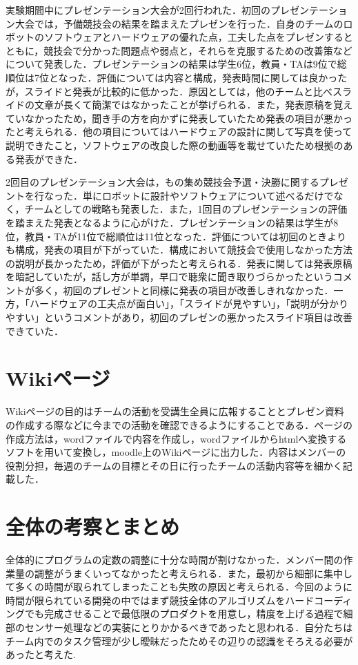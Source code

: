 \begin{multicols*}{2}
実験期間中にプレゼンテーション大会が2回行われた．初回のプレゼンテーション大会では，予備競技会の結果を踏まえたプレゼンを行った．自身のチームのロボットのソフトウェアとハードウェアの優れた点，工夫した点をプレゼンするとともに，競技会で分かった問題点や弱点と，それらを克服するための改善策などについて発表した．プレゼンテーションの結果は学生6位，教員・TAは9位で総順位は7位となった．評価については内容と構成，発表時間に関しては良かったが，スライドと発表が比較的に低かった．原因としては，他のチームと比べスライドの文章が長くて簡潔ではなかったことが挙げられる．また，発表原稿を覚えていなかったため，聞き手の方を向かずに発表していたため発表の項目が悪かったと考えられる．他の項目についてはハードウェアの設計に関して写真を使って説明できたこと，ソフトウェアの改良した際の動画等を載せていたため根拠のある発表ができた．

2回目のプレゼンテーション大会は，もの集め競技会予選・決勝に関するプレゼントを行なった．単にロボットに設計やソフトウェアについて述べるだけでなく，チームとしての戦略も発表した．また，1回目のプレゼンテーションの評価を踏まえた発表となるように心がけた．プレゼンテーションの結果は学生が8位，教員・TAが11位で総順位は11位となった．評価については初回のときよりも構成，発表の項目が下がっていた．構成において競技会で使用しなかった方法の説明が長かったため，評価が下がったと考えられる．発表に関しては発表原稿を暗記していたが，話し方が単調，早口で聴衆に聞き取りづらかったというコメントが多く，初回のプレゼントと同様に発表の項目が改善しきれなかった．一方，「ハードウェアの工夫点が面白い」，「スライドが見やすい」，「説明が分かりやすい」というコメントがあり，初回のプレゼンの悪かったスライド項目は改善できていた．

\section{Wikiページ} %
Wikiページの目的はチームの活動を受講生全員に広報することとプレゼン資料の作成する際などに今までの活動を確認できるようにすることである．ページの作成方法は，wordファイルで内容を作成し，wordファイルからhtmlへ変換するソフトを用いて変換し，moodle上のWikiページに出力した．内容はメンバーの役割分担，毎週のチームの目標とその日に行ったチームの活動内容等を細かく記載した．


\section{全体の考察とまとめ}%
全体的にプログラムの定数の調整に十分な時間が割けなかった．メンバー間の作業量の調整がうまくいってなかったと考えられる．また，最初から細部に集中して多くの時間が取られてしまったことも失敗の原因と考えられる．今回のように時間が限られている開発の中ではまず競技全体のアルゴリズムをハードコーディングでも完成させることで最低限のプロダクトを用意し，精度を上げる過程で細部のセンサー処理などの実装にとりかかるべきであったと思われる．自分たちはチーム内でのタスク管理が少し曖昧だったためその辺りの認識をそろえる必要があったと考えた. 


\end{multicols*}
